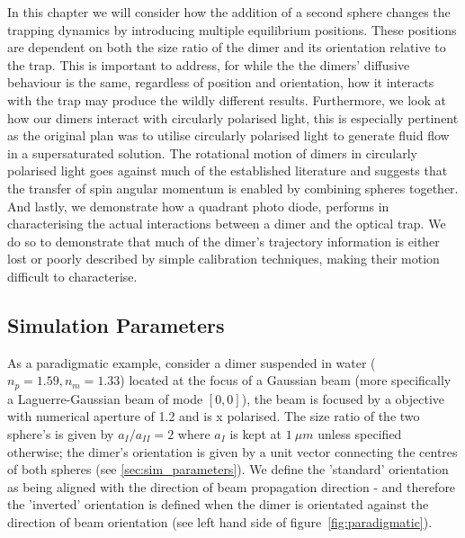 In this chapter we will consider how the addition of a second sphere changes 
the trapping dynamics by introducing multiple equilibrium positions. These 
positions are dependent on both the size ratio of the dimer and its orientation
relative to the trap. This is important to address, for while the the dimers' 
diffusive behaviour is the same, regardless of position and orientation, how it
interacts with the trap may produce the wildly different results. Furthermore,
we look at how our dimers interact with circularly polarised light, this is 
especially pertinent as the original plan was to utilise circularly polarised 
light to generate fluid flow in a supersaturated solution. The rotational motion 
of dimers in circularly polarised light goes against much of the established 
literature and suggests that the transfer of spin angular momentum is enabled 
by combining spheres together. And lastly, we demonstrate how a quadrant photo 
diode, performs in characterising the actual interactions between a dimer and 
the optical trap. We do so to demonstrate that much of the dimer's trajectory
information is either lost or poorly described by simple calibration techniques, 
making their motion difficult to characterise. 

\subsection{Simulation Parameters}
As a paradigmatic example, consider a dimer suspended in water ($n_p = 1.59, 
n_m = 1.33$) located at the focus of a Gaussian beam (more specifically a 
Laguerre-Gaussian beam of mode $[0,0]$), the beam is focused by a objective 
with numerical aperture of 1.2 and is x polarised. The size ratio of the two 
sphere's is given by $a_{I}/a_{II} = 2$ where $a_{I}$ is kept at $1\ \mu m$ 
unless specified otherwise; the dimer's orientation is given by a unit vector 
connecting the centres of both spheres (see \ref{sec:sim_parameters}). We 
define the 'standard' orientation as being aligned with the direction of 
beam propagation direction - and therefore the 'inverted' orientation is 
defined when the dimer is orientated against the direction of beam 
orientation (see left hand side of figure~\ref{fig:paradigmatic}). 


